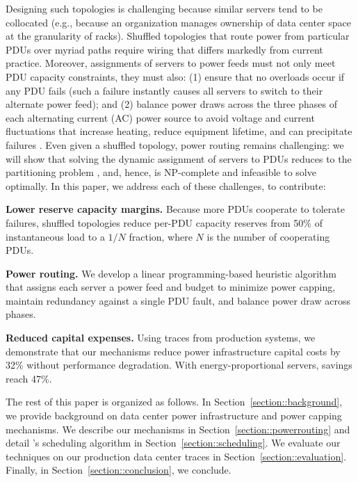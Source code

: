 Designing such topologies is challenging because similar servers tend to be collocated (e.g., because an organization manages ownership of data center space at the granularity of racks).  Shuffled topologies that route power from particular PDUs over myriad paths require wiring that differs markedly from current practice.  Moreover, assignments of servers to power feeds must not only meet PDU capacity constraints, they must also: (1) ensure that no overloads occur if any PDU fails (such a failure instantly causes all servers to switch to their alternate power feed); and (2) balance power draws across the three phases of each alternating current (AC) power source to avoid voltage and current fluctuations that increase heating, reduce equipment lifetime, and can precipitate failures \cite{Gruzs90}. Even given a shuffled topology, power routing remains challenging: we will show that solving the dynamic assignment of servers to PDUs reduces to the partitioning problem \cite{GareyBook}, and, hence, is NP-complete and infeasible to solve optimally.  In this paper, we address each of these challenges, to contribute:

\begin{packed_itemize}

\item {\bf Lower reserve capacity margins.}   Because more PDUs cooperate to tolerate failures, shuffled topologies reduce per-PDU capacity reserves from 50\% of instantaneous load to a $1/N$ fraction, where $N$ is the number of cooperating PDUs.   
\vspace{4pt}
\item {\bf Power routing.} We develop a linear programming-based heuristic algorithm that assigns each server a power feed and budget to minimize power capping, maintain redundancy against a single PDU fault, and balance power draw across phases.
\vspace{4pt}
\item {\bf Reduced capital expenses.}  Using traces from production systems, we demonstrate that our mechanisms reduce power infrastructure capital costs by 32\% without performance degradation.  With energy-proportional servers, savings reach 47\%.

\end{packed_itemize}

The rest of this paper is organized as follows.  In Section~\ref{section::background}, we provide background on data center power infrastructure and power capping mechanisms.   We describe our mechanisms in Section~\ref{section::powerrouting} and detail \PowerRouting's scheduling algorithm in Section~\ref{section::scheduling}.  We evaluate our techniques on our production data center traces in Section~\ref{section::evaluation}.  Finally, in Section~\ref{section::conclusion}, we conclude. 
